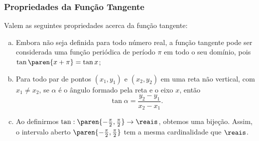 \subsubsection{Propriedades da Função Tangente}

\begin{proposition}
    Valem as seguintes propriedades acerca da função tangente:

\begin{enumerate}[(a)]
  \item Embora não seja definida para todo número real, a função
  tangente pode ser considerada uma função periódica de período
  $\pi$ em todo o seu domínio, pois $\tan \paren{x+\pi} = \tan x$;
  \item Para todo par de pontos  $(x_1, y_1)$ e $(x_2, y_2)$ em uma reta não vertical, com $x_1 \neq x_2$, se
  $\alpha$ é o ângulo formado pela reta e o eixo $x$, então $$\tan
  \alpha = \frac {y_2 - y_1} {x_2 - x_1}.$$
  \item Ao definirmos $\tan: \paren{- \frac {\pi} 2, \frac {\pi} 2} \to \reais$,
obtemos uma bijeção. Assim, o intervalo aberto $\paren{- \frac {\pi}
2, \frac {\pi} 2}$ tem a mesma cardinalidade que $\reais$.
\end{enumerate}
\end{proposition}

